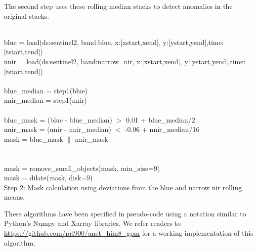 \documentclass[essd, manuscript]{copernicus}
\begin{document}
The second step uses these rolling median stacks to detect anomalies in the original stacks. 

\begin{algorithm}[H]
\SetAlgoLined
 \\
 blue = load(ds:sentinel2, band:blue, x:[xstart,xend], y:[ystart,yend],time:[tstart,tend])\\
 nnir = load(ds:sentinel2, band:narrow\_nir, x:[xstart,xend], y:[ystart,yend],time:[tstart,tend])\\
 
 \\
 blue\_median = step1(blue)\\
 nnir\_median = step1(nnir)\\
 
 \\
 blue\_mask = (blue - blue\_median) $>$ 0.01 + blue\_median/2\\
 nnir\_mask = (nnir - nnir\_median) $<$ -0.06 + nnir\_median/16\\
 mask = blue\_mask $\parallel$ nnir\_mask\\
 \\
 \\
 mask = remove\_small\_objects(mask, min\_size=9)\\
 mask = dilate(mask, disk=9)\\
 \caption{Step 2: Mask calculation using deviations from the blue and narrow nir rolling means.}
\end{algorithm}

These algorithms have been specified in pseudo-code using a notation similar to Python's Numpy and Xarray libraries. We refer readers to \href{https://github.com/prl900/unet_him8_gpm}{https://github.com/prl900/unet\_him8\_gpm} for a working implementation of this algorithm.



\noappendix       %

\end{document}
